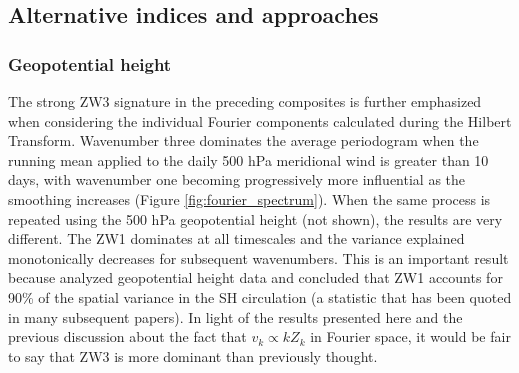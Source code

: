 \subsection{Alternative indices and approaches}

\subsubsection{Geopotential height}\label{s:geopotential_height}

The strong ZW3 signature in the preceding composites is further emphasized when considering the individual Fourier components calculated during the Hilbert Transform. Wavenumber three dominates the average periodogram when the running mean applied to the daily 500 hPa meridional wind is greater than 10 days, with wavenumber one becoming progressively more influential as the smoothing increases (Figure \ref{fig:fourier_spectrum}). When the same process is repeated using the 500 hPa geopotential height (not shown), the results are very different. The ZW1 dominates at all timescales and the variance explained monotonically decreases for subsequent wavenumbers. This is an important result because \citet{vanLoon1972} analyzed geopotential height data and concluded that ZW1 accounts for 90\% of the spatial variance in the SH circulation (a statistic that has been quoted in many subsequent papers). In light of the results presented here and the previous discussion about the fact that $v_k \propto k Z_k$ in Fourier space, it would be fair to say that ZW3 is more dominant than previously thought. 